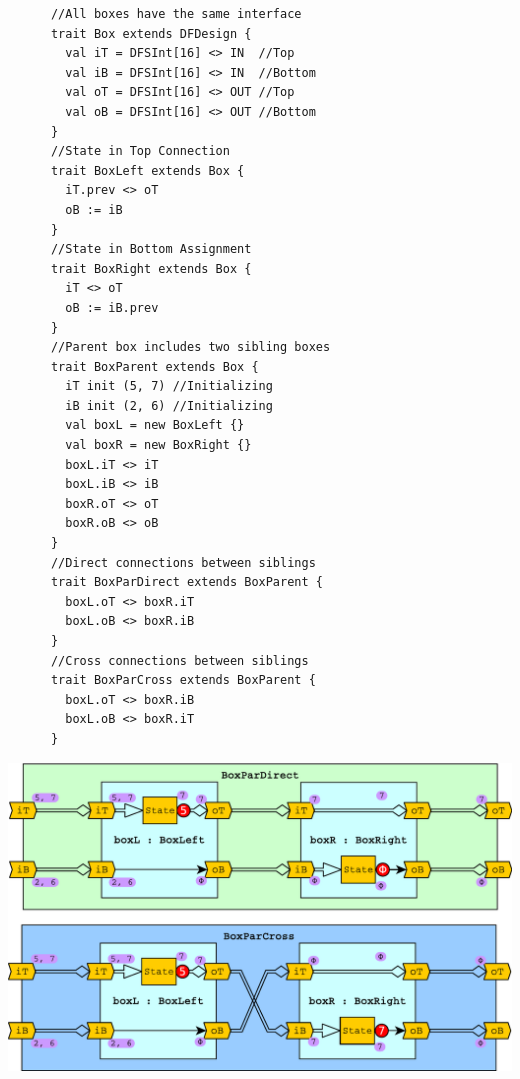 \begin{table}[t]
  \small
  \begin{minipage}[t][9cm][t]{0.34\linewidth}
    \centering
    \captionsetup{justification=centering}
    \begin{verbatim}
      //All boxes have the same interface
      trait Box extends DFDesign {
        val iT = DFSInt[16] <> IN  //Top
        val iB = DFSInt[16] <> IN  //Bottom
        val oT = DFSInt[16] <> OUT //Top
        val oB = DFSInt[16] <> OUT //Bottom
      }
      //State in Top Connection
      trait BoxLeft extends Box {
        iT.prev <> oT
        oB := iB
      }
      //State in Bottom Assignment
      trait BoxRight extends Box {
        iT <> oT
        oB := iB.prev
      }
      //Parent box includes two sibling boxes 
      trait BoxParent extends Box {
        iT init (5, 7) //Initializing
        iB init (2, 6) //Initializing
        val boxL = new BoxLeft {}
        val boxR = new BoxRight {}
        boxL.iT <> iT 
        boxL.iB <> iB
        boxR.oT <> oT
        boxR.oB <> oB
      }
      //Direct connections between siblings
      trait BoxParDirect extends BoxParent {
        boxL.oT <> boxR.iT
        boxL.oB <> boxR.iB
      }
      //Cross connections between siblings
      trait BoxParCross extends BoxParent {
        boxL.oT <> boxR.iB
        boxL.oB <> boxR.iT
      }
    \end{verbatim}
    \vfill
    \label{fig:BoxTopCode}
  \end{minipage}%
  \hfill
  \begin{minipage}[t][12cm][b]{0.64\linewidth}
    \centering
    \captionsetup{justification=centering}
    \includegraphics[width=\linewidth]{graphics/connectivity.pdf}

\end{minipage}
\end{table}
